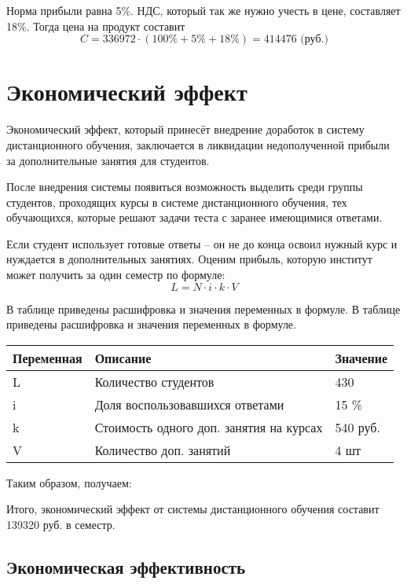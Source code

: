 Норма прибыли равна 5\%. НДС, который так же нужно учесть в цене, составляет 18\%. Тогда цена на продукт составит
$$
C = 336972 \cdot (100\% + 5\% + 18\%) = 414476 \mbox{ (руб.)}
$$

\section{Экономический эффект}

Экономический эффект, который принесёт внедрение доработок в систему дистанционного обучения, заключается в ликвидации недополученной прибыли за дополнительные занятия для студентов.

После внедрения системы появиться возможность выделить среди группы студентов, проходящих курсы в системе дистанционного обучения, тех обу\-чающихся, которые решают задачи теста с заранее имеющимися ответами.

Если студент использует  готовые ответы – он не до конца освоил нужный курс и нуждается в дополнительных занятиях. Оценим прибыль, которую институт может получить за один семестр по формуле:
$$
L = N \cdot i \cdot k \cdot V
$$

В таблице приведены расшифровка и значения переменных в формуле.
В таблице приведены расшифровка и значения переменных в формуле.
\begin{table}[H]
\begin{center}
\begin{tabular}{|p{3.0cm}|p{4.1cm}|p{2.6cm}|}
\hline
Переменная&
Описание&
Значение\\
\hline
L&
Количество студентов &
430\\
\hline
i&
Доля воспользовавшихся ответами&
15 \%\\
\hline
k&
Стоимость одного доп. занятия на курсах&
540 руб.\\
\hline
V&
Количество доп. занятий&
4 шт
\\
\hline
\end{tabular}
\end{center}
\end{table}

Таким образом, получаем:

Итого, экономический эффект от системы дистанционного обучения сос\-тавит 139320 руб. в семестр.

\subsection{Экономическая эффективность}

